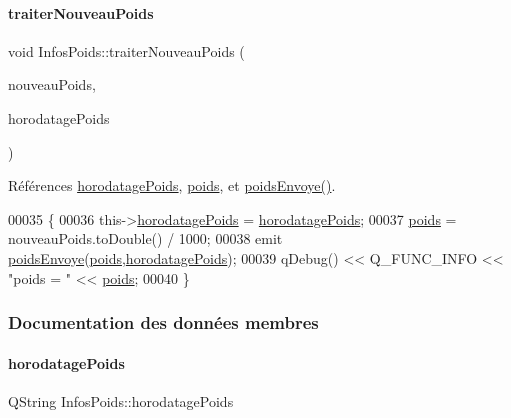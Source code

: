 \paragraph{\texorpdfstring{traiter\+Nouveau\+Poids}{traiterNouveauPoids}}
{\footnotesize\ttfamily void Infos\+Poids\+::traiter\+Nouveau\+Poids (\begin{DoxyParamCaption}\item[{Q\+String}]{nouveau\+Poids,  }\item[{Q\+String}]{horodatage\+Poids }\end{DoxyParamCaption})\hspace{0.3cm}{\ttfamily [slot]}}



Références \hyperlink{class_infos_poids_a6cff463552adfdde9430073a87878494}{horodatage\+Poids}, \hyperlink{class_infos_poids_ac5faebb99bd0f87f96b442f10349cbd8}{poids}, et \hyperlink{class_infos_poids_a3c4ca9068911e45d0207de051ef5b402}{poids\+Envoye()}.


\begin{DoxyCode}
00035 \{
00036     this->\hyperlink{class_infos_poids_a6cff463552adfdde9430073a87878494}{horodatagePoids} = \hyperlink{class_infos_poids_a6cff463552adfdde9430073a87878494}{horodatagePoids};
00037     \hyperlink{class_infos_poids_ac5faebb99bd0f87f96b442f10349cbd8}{poids} = nouveauPoids.toDouble() / 1000;
00038     emit \hyperlink{class_infos_poids_a3c4ca9068911e45d0207de051ef5b402}{poidsEnvoye}(\hyperlink{class_infos_poids_ac5faebb99bd0f87f96b442f10349cbd8}{poids},\hyperlink{class_infos_poids_a6cff463552adfdde9430073a87878494}{horodatagePoids});
00039     qDebug() << Q\_FUNC\_INFO << \textcolor{stringliteral}{"poids = "} << \hyperlink{class_infos_poids_ac5faebb99bd0f87f96b442f10349cbd8}{poids};
00040 \}
\end{DoxyCode}


\subsubsection{Documentation des données membres}
\mbox{\label{class_infos_poids_a6cff463552adfdde9430073a87878494}} 
\paragraph{\texorpdfstring{horodatage\+Poids}{horodatagePoids}}
{\footnotesize\ttfamily Q\+String Infos\+Poids\+::horodatage\+Poids\hspace{0.3cm}{\ttfamily [private]}}



